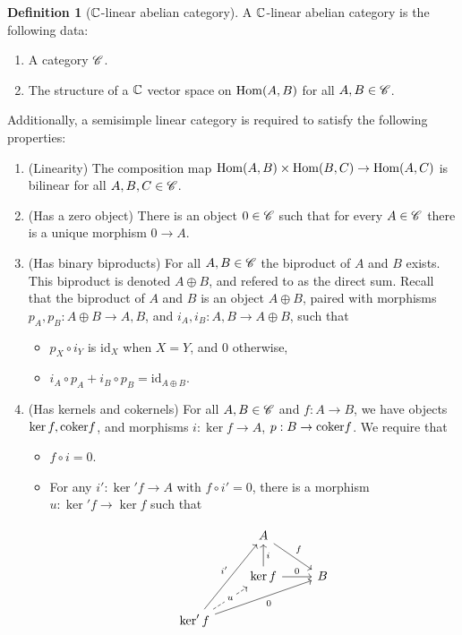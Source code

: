 \documentclass{article}
\theoremstyle{definition}
\newtheorem*{definition}{Definition}
\numberwithin{figure}{section}
\begin{document}
\begin{definition}[$\mathbb{C}$-linear abelian category]  A $\mathbb{C}$-linear abelian category is the following data:

\begin{enumerate}
\item A category $\mathscr{C}$.
\item The structure of a $\mathbb{C}$ vector space on $\mathrm{Hom}(A,B)$ for all $A,B\in \mathscr{C}$.
\end{enumerate}

Additionally, a semisimple linear category is required to satisfy the following properties:

\begin{enumerate}
\item (Linearity) The composition map $\mathrm{Hom}(A,B)\times \mathrm{Hom}(B,C)\to \mathrm{Hom}(A,C)$ is bilinear for all $A,B,C\in \mathscr{C}$.
\item (Has a zero object) There is an object $0\in \mathscr{C}$ such that for every $A\in \mathscr{C}$ there is a unique morphism $0\to A$.
\item (Has binary biproducts) For all $A,B\in \mathscr{C}$ the biproduct of $A$ and $B$ exists. This biproduct is denoted $A\oplus B$, and refered to as the direct sum. Recall that the biproduct of $A$ and $B$ is an object $A\oplus B$, paired with morphisms $p_{A},p_{B}: A\oplus B\to A,B$, and  $i_{A},i_{B}: A,B\to A\oplus B$, such that

\begin{itemize}
\item $p_{X}\circ i_{Y}$ is $\text{id}_X$ when $X=Y$, and $0$ otherwise,
\item $i_{A}\circ p_{A}+i_{B}\circ p_{B}=\text{id}_{A\oplus B}$.
\end{itemize}
\item (Has kernels and cokernels) For all $A,B\in \mathscr{C}$ and $f:A\to B$, we have objects $\ker f, \mathrm{coker} f$, and morphisms $i:\ker f\to A$, $p: B\to \mathrm{coker} f$. We require that

\begin{itemize}
\item $f\circ i=0$.
\item For any $i': \ker' f\to A$ with $f\circ i'=0$, there is a morphism $u: \ker'f\to \ker f$ such that

\[\begin{tikzcd}
	& A \\
	& {\ker f} & B \\
	{\ker' f}
	\arrow["f", from=1-2, to=2-3]
	\arrow["{i'}", from=3-1, to=1-2]
	\arrow["0"', from=3-1, to=2-3]
	\arrow["i"', from=2-2, to=1-2]
	\arrow["0", from=2-2, to=2-3]
	\arrow["u"{description}, dashed, from=3-1, to=2-2]
\end{tikzcd}\]


\end{itemize}
\end{enumerate}
\end{definition}
\end{document}
